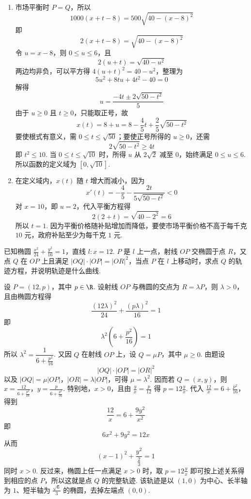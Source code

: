\documentclass[UTF8,a4paper,oneside,11pt]{ctexbook}
\begin{document}
\begin{solution}
\begin{enumerate}
\item 市场平衡时 \(P=Q\)，所以
\[
1000(x+t-8)=500\sqrt{40-(x-8)^2}
\]
即
\[
2(x+t-8)=\sqrt{40-(x-8)^2}
\]
令 \(u=x-8\)，则 \(0\leqslant u\leqslant6\)，且
\[
2(u+t)=\sqrt{40-u^2}
\]
两边均非负，可以平方得 \(4(u+t)^2=40-u^2\)，整理为
\[
5u^2+8tu+4t^2-40=0
\]
解得
\[
u=\frac{-4t\pm2\sqrt{50-t^2}}{5}
\]
由于 \(u\geqslant0\) 且 \(t\geqslant0\)，只能取正号，故
\[
x(t)=8+u=8-\frac45t+\frac25\sqrt{50-t^2}
\]
要使根式有意义，需 \(0\leqslant t\leqslant\sqrt{50}\)；要使正号所得的 \(u\geqslant0\)，还需
\[
2\sqrt{50-t^2}\geqslant4t
\]
即 \(t^2\leqslant10\). 当 \(0\leqslant t\leqslant\sqrt{10}\) 时，所得 \(u\) 从 \(2\sqrt{2}\) 减至 \(0\)，始终满足 \(0\leqslant u\leqslant6\). 所以函数的定义域为 \([0,\sqrt{10}]\).

\item 在定义域内，\(x(t)\) 随 \(t\) 增大而减小，因为
\[
x'(t)=-\frac45-\frac{2t}{5\sqrt{50-t^2}}<0
\]
对 \(x=10\)，即 \(u=2\)，代入平衡方程得
\[
2(2+t)=\sqrt{40-2^2}=6
\]
所以 \(t=1\). 因为平衡价格随补贴增加而降低，要使市场平衡价格不高于每千克 \(10\text{ 元}\)，政府补贴至少为每千克 \(1\text{ 元}\).
\end{enumerate}
\end{solution}

\begin{problem}
已知椭圆 \(\frac{x^2}{24} + \frac{y^2}{16} = 1\)，直线 \(l: x = 12\). \(P\) 是 \(l\) 上一点，射线 \(OP\) 交椭圆于点 \(R\)，又点 \(Q\) 在 \(OP\) 上且满足 \(|OQ| \cdot |OP| = |OR|^2\)，当点 \(P\) 在 \(l\) 上移动时，求点 \(Q\) 的轨迹方程，并说明轨迹是什么曲线.
\end{problem}

\begin{solution}
设 \(P=(12,p)\)，其中 \(p\in\R\). 设射线 \(OP\) 与椭圆的交点为 \(R=\lambda P\)，则 \(\lambda>0\)，且由椭圆方程得
\[
\frac{(12\lambda)^2}{24}+\frac{(p\lambda)^2}{16}=1
\]
即
\[
\lambda^2\left(6+\frac{p^2}{16}\right)=1
\]
所以 \(\lambda^2=\dfrac{1}{6+\frac{p^2}{16}}\). 又因 \(Q\) 在射线 \(OP\) 上，设 \(Q=\mu P\)，其中 \(\mu\geqslant0\). 由题设
\[
|OQ|\cdot|OP|=|OR|^2
\]
以及 \(|OQ|=\mu|OP|\)，\(|OR|=\lambda|OP|\)，可得 \(\mu=\lambda^2\). 因而若 \(Q=(x,y)\)，则 \(x=\frac{12}{6+\frac{p^2}{16}}\)，\(y=\frac{p}{6+\frac{p^2}{16}}\).
特别地，\(x>0\)，且由 \(\frac{y}{x}=\frac{p}{12}\) 得 \(p=12\frac{y}{x}\). 代入 \(\frac{12}{x}=6+\frac{p^2}{16}\)，得到
\[
\frac{12}{x}=6+\frac{9y^2}{x^2}
\]
即
\[
6x^2+9y^2=12x
\]
从而
\[
(x-1)^2+\frac{y^2}{\frac23}=1
\]
同时 \(x>0\).
反过来，椭圆上任一点满足 \(x>0\) 时，取 \(p=12\frac{y}{x}\) 即可按上述关系得到相应的点 \(P\)，所以这就是点 \(Q\) 的完整轨迹. 该轨迹是以 \((1,0)\) 为中心、长半轴为 \(1\)、短半轴为 \(\frac{\sqrt{6}}{3}\) 的椭圆，去掉左端点 \((0,0)\).
\end{solution}

\end{document}
